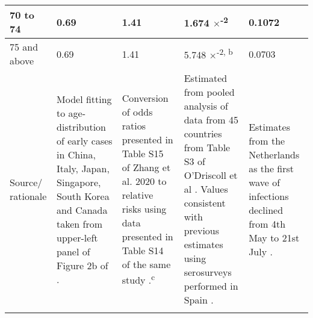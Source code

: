 \begin{table}[ht]
\begin{tabular}[ht]{| p{2cm} | p{2.5cm} | p{3cm} | p{3cm} | p{2.5cm}|}
        \hline
        70 to 74 & 0.69 & 1.41 & 1.674 $\times$\textsuperscript{-2} & 0.1072 \\
        \hline
        75 and above & 0.69 & 1.41 & 5.748 $\times$\textsuperscript{-2, b} & 0.0703 \\
        \hline
        Source/ rationale & 
        Model fitting to age-distribution of early cases in China, Italy, Japan, Singapore, South Korea and Canada taken from upper-left panel of Figure 2b of \cite{RN33}. & Conversion of odds ratios presented in Table S15 of Zhang et al. 2020 to relative risks using data presented in Table S14 of the same study \cite{RN7}.\textsuperscript{c} & Estimated from pooled analysis of data from 45 countries from Table S3 of O'Driscoll et al \cite{RN6}. Values consistent with previous estimates using serosurveys performed in Spain \cite{RN21}. &
        Estimates from the Netherlands as the first wave of infections declined from 4th May to 21st July \cite{RN9}.\\
        \hline        
    \label{age_params}
    \end{tabular}
\end{table}

\clearpage